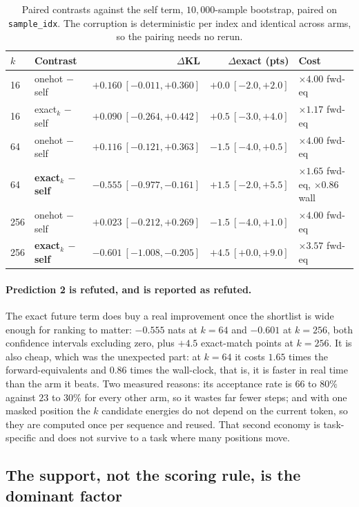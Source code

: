\documentclass[11pt,a4paper]{article}
\begin{document}
\begin{table}[htbp]
\centering
\begin{tabular}{llrrl}
\toprule
$k$ & Contrast & $\Delta$KL & $\Delta$exact (pts) & Cost \\
\midrule
16  & onehot $-$ self  & $+0.160\ [-0.011,+0.360]$ & $+0.0\ [-2.0,+2.0]$ & $\times 4.00$ fwd-eq \\
16  & exact$_k$ $-$ self & $+0.090\ [-0.264,+0.442]$ & $+0.5\ [-3.0,+4.0]$ & $\times 1.17$ fwd-eq \\
64  & onehot $-$ self  & $+0.116\ [-0.121,+0.363]$ & $-1.5\ [-4.0,+0.5]$ & $\times 4.00$ fwd-eq \\
64  & \textbf{exact$_k$ $-$ self} & $\bm{-0.555\ [-0.977,-0.161]}$ & $+1.5\ [-2.0,+5.5]$ & $\times1.65$ fwd-eq, $\bm{\times 0.86}$ wall \\
256 & onehot $-$ self  & $+0.023\ [-0.212,+0.269]$ & $-1.5\ [-4.0,+1.0]$ & $\times 4.00$ fwd-eq \\
256 & \textbf{exact$_k$ $-$ self} & $\bm{-0.601\ [-1.008,-0.205]}$ & $\bm{+4.5\ [+0.0,+9.0]}$ & $\times 3.57$ fwd-eq \\
\bottomrule
\end{tabular}
\caption{Paired contrasts against the self term, $10{,}000$-sample bootstrap, paired on
\texttt{sample\_idx}. The corruption is deterministic per index and identical across
arms, so the pairing needs no rerun.}
\end{table}

\paragraph{Prediction 2 is refuted, and is reported as refuted.}
The exact future term does buy a real improvement once the shortlist is wide enough for
ranking to matter: $-0.555$ nats at $k=64$ and $-0.601$ at $k=256$, both confidence
intervals excluding zero, plus $+4.5$ exact-match points at $k=256$. It is also cheap,
which was the unexpected part: at $k=64$ it costs $1.65$ times the forward-equivalents
and $0.86$ times the wall-clock, that is, it is faster in real time than the arm it
beats. Two measured reasons: its acceptance rate is $66$ to $80\%$ against $23$ to $30\%$
for every other arm, so it wastes far fewer steps; and with one masked position the $k$
candidate energies do not depend on the current token, so they are computed once per
sequence and reused. That second economy is task-specific and does not survive to a task
where many positions move.

\subsection{The support, not the scoring rule, is the dominant factor}
\end{document}
